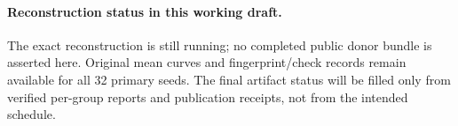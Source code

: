 \paragraph{Reconstruction status in this working draft.} The exact reconstruction is still running; no completed public donor bundle is asserted here. Original mean curves and fingerprint/check records remain available for all 32 primary seeds. The final artifact status will be filled only from verified per-group reports and publication receipts, not from the intended schedule. 
